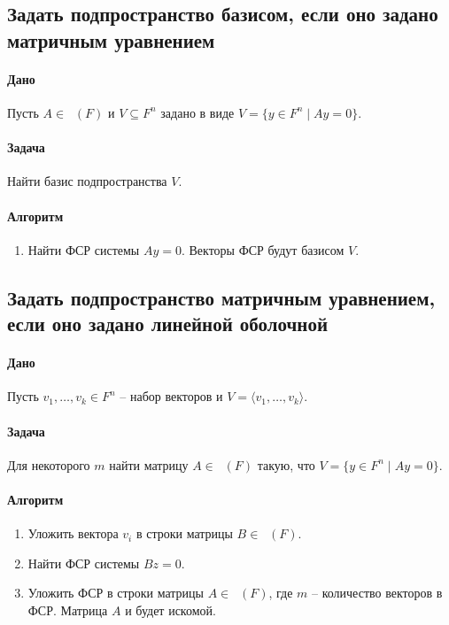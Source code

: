 \documentclass{article}
\newcommand{\MatrixDim}[3]{\mathop{\mathrm{M}_{#2\,#3}}(#1)}
\begin{document}
\subsection{Задать подпространство базисом, если оно задано матричным уравнением}


\paragraph{Дано} Пусть $A\in\MatrixDim{F}{m}{n}$ и $V\subseteq F^{n}$ задано в виде $V = \{y\in F^{n}\mid A y = 0\}$.

\paragraph{Задача} Найти базис подпространства $V$.

\paragraph{Алгоритм}
\begin{enumerate}
\item Найти ФСР системы $Ay = 0$. Векторы ФСР будут базисом $V$.
\end{enumerate}

\subsection{Задать подпространство матричным уравнением, если оно задано линейной оболочной}

\paragraph{Дано} Пусть $v_1,\ldots,v_k\in F^{n}$ -- набор векторов и $V = \langle v_1,\ldots,v_k \rangle$.

\paragraph{Задача} Для некоторого $m$ найти матрицу $A\in\MatrixDim{F}{m}{n}$ такую, что $V = \{y\in F^{n}\mid Ay = 0\}$.

\paragraph{Алгоритм}
\begin{enumerate}
\item Уложить вектора $v_i$ в строки матрицы $B\in \MatrixDim{F}{k}{n}$.
\item Найти ФСР системы $Bz = 0$.
\item Уложить ФСР в строки матрицы $A\in \MatrixDim{F}{m}{n}$, где $m$ -- количество векторов в ФСР. Матрица $A$ и будет искомой.
\end{enumerate}
\end{document}
